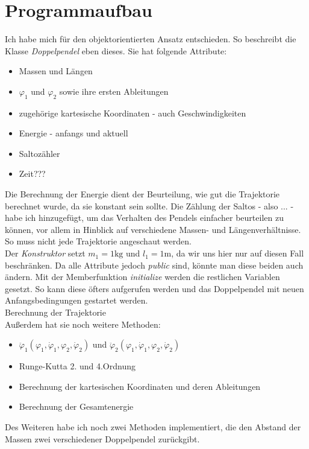 \documentclass[12pt,a4paper,titlepage,headinclude,bibtotoc]{scrartcl}
\begin{document}
\section{Programmaufbau}
Ich habe mich für den objektorientierten Ansatz entschieden.
So beschreibt die Klasse \textit{Doppelpendel} eben dieses. 
Sie hat folgende Attribute:
\begin{itemize}
	\item Massen und Längen	
	\item $\varphi_1$ und $\varphi_2$ sowie ihre ersten Ableitungen
	\item zugehörige kartesische Koordinaten - auch Geschwindigkeiten
	\item Energie - anfangs und aktuell
	\item Saltozähler
	\item Zeit???
\end{itemize}
Die Berechnung der Energie dient der Beurteilung, wie gut die Trajektorie berechnet wurde, da sie konstant sein sollte.
Die Zählung der Saltos - also ... - habe ich hinzugefügt, um das Verhalten des Pendels einfacher beurteilen zu können, vor allem in Hinblick auf verschiedene Massen- und Längenverhältnisse.
So muss nicht jede Trajektorie angeschaut werden.\\
Der \textit{Konstruktor} setzt $m_1=1\si{\kilo\gram}$ und $l_1=1\si{\meter}$, da wir uns hier nur auf diesen Fall beschränken.
Da alle Attribute jedoch \textit{public} sind, könnte man diese beiden auch ändern.
Mit der Memberfunktion \textit{initialize} werden die restlichen Variablen gesetzt.
So kann diese öfters aufgerufen werden und das Doppelpendel mit neuen Anfangsbedingungen gestartet werden.\\
Berechnung der Trajektorie\\
Außerdem hat sie noch weitere Methoden:
\begin{itemize}
	\item $\ddot{\varphi}_1\left(\varphi_1, \dot{\varphi}_1,\varphi_2, \dot{\varphi}_2\right)$ und $\ddot{\varphi}_2\left(\varphi_1, \dot{\varphi}_1,\varphi_2, \dot{\varphi}_2\right)$
	\item Runge-Kutta 2. und 4.Ordnung	
	\item Berechnung der kartesischen Koordinaten und deren Ableitungen
	\item Berechnung der Gesamtenergie
\end{itemize}

Des Weiteren habe ich noch zwei Methoden implementiert, die den Abstand der Massen zwei verschiedener Doppelpendel zurückgibt.
\end{document}
